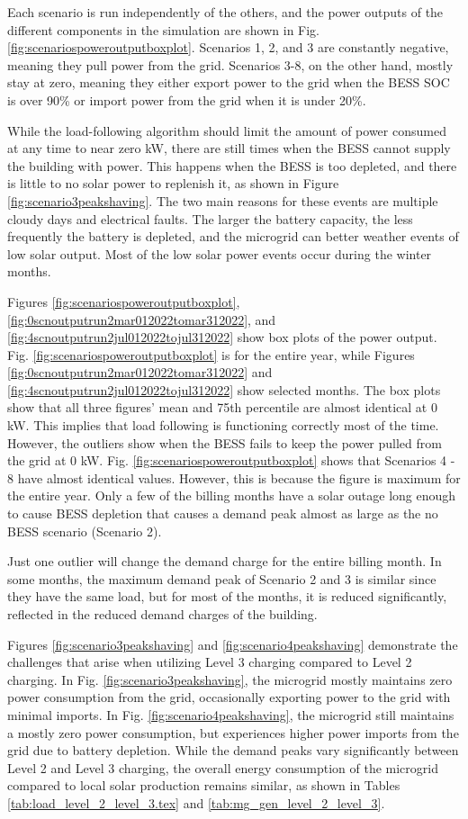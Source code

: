 \documentclass[conference]{IEEEtran}
\begin{document}
	Each scenario is run independently of the others, and the power outputs of the different components in the simulation are shown in Fig. \ref{fig:scenariospoweroutputboxplot}. Scenarios 1, 2, and 3 are constantly negative, meaning they pull power from the grid. Scenarios 3-8, on the other hand, mostly stay at zero, meaning they either export power to the grid when the BESS SOC is over 90\% or import power from the grid when it is under 20\%.
	
	While the load-following algorithm should limit the amount of power consumed at any time to near zero kW, there are still times when the BESS cannot supply the building with power. This happens when the BESS is too depleted, and there is little to no solar power to replenish it, as shown in Figure \ref{fig:scenario3peakshaving}. The two main reasons for these events are multiple cloudy days and electrical faults. The larger the battery capacity, the less frequently the battery is depleted, and the microgrid can better weather events of low solar output. Most of the low solar power events occur during the winter months.
	
	Figures \ref{fig:scenariospoweroutputboxplot}, \ref{fig:0scnoutputrun2mar012022tomar312022}, and \ref{fig:4scnoutputrun2jul012022tojul312022} show box plots of the power output. Fig. \ref{fig:scenariospoweroutputboxplot} is for the entire year, while Figures \ref{fig:0scnoutputrun2mar012022tomar312022} and \ref{fig:4scnoutputrun2jul012022tojul312022} show selected months. The box plots show that all three figures' mean and 75th percentile are almost identical at 0 kW. This implies that load following is functioning correctly most of the time. However, the outliers show when the BESS fails to keep the power pulled from the grid at 0 kW. Fig. \ref{fig:scenariospoweroutputboxplot} shows that Scenarios 4 - 8 have almost identical values. However, this is because the figure is maximum for the entire year. Only a few of the billing months have a solar outage long enough to cause BESS depletion that causes a demand peak almost as large as the no BESS scenario (Scenario 2).
	
	Just one outlier will change the demand charge for the entire billing month. In some months, the maximum demand peak of Scenario 2 and 3 is similar since they have the same load, but for most of the months, it is reduced significantly, reflected in the reduced demand charges of the building.
	
	Figures \ref{fig:scenario3peakshaving} and \ref{fig:scenario4peakshaving} demonstrate the challenges that arise when utilizing Level 3 charging compared to Level 2 charging. In Fig. \ref{fig:scenario3peakshaving}, the microgrid mostly maintains zero power consumption from the grid, occasionally exporting power to the grid with minimal imports. In Fig. \ref{fig:scenario4peakshaving}, the microgrid still maintains a mostly zero power consumption, but experiences higher power imports from the grid due to battery depletion. While the demand peaks vary significantly between Level 2 and Level 3 charging, the overall energy consumption of the microgrid compared to local solar production remains similar, as shown in Tables \ref{tab:load_level_2_level_3.tex} and \ref{tab:mg_gen_level_2_level_3}.
	
\end{document}
